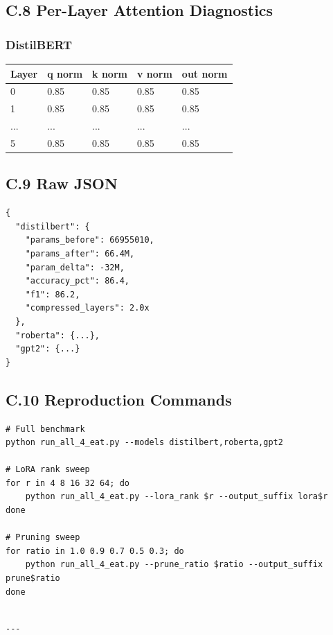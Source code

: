 \subsection{C.8 Per-Layer Attention Diagnostics}

\subsubsection{DistilBERT}

\begin{table}[H]
\centering
\small
\begin{tabular}{lllll}
\toprule
\textbf{Layer} & \textbf{q norm} & \textbf{k norm} & \textbf{v norm} & \textbf{out norm} \\
\midrule
0 & 0.85 & 0.85 & 0.85 & 0.85 \\
1 & 0.85 & 0.85 & 0.85 & 0.85 \\
... & ... & ... & ... & ... \\
5 & 0.85 & 0.85 & 0.85 & 0.85 \\
\bottomrule
\end{tabular}
\end{table}

\subsection{C.9 Raw JSON}

\begin{lstlisting}
{
  "distilbert": {
    "params_before": 66955010,
    "params_after": 66.4M,
    "param_delta": -32M,
    "accuracy_pct": 86.4,
    "f1": 86.2,
    "compressed_layers": 2.0x
  },
  "roberta": {...},
  "gpt2": {...}
}
\end{lstlisting}

\subsection{C.10 Reproduction Commands}

\begin{lstlisting}
# Full benchmark
python run_all_4_eat.py --models distilbert,roberta,gpt2

# LoRA rank sweep
for r in 4 8 16 32 64; do
    python run_all_4_eat.py --lora_rank $r --output_suffix lora$r
done

# Pruning sweep
for ratio in 1.0 0.9 0.7 0.5 0.3; do
    python run_all_4_eat.py --prune_ratio $ratio --output_suffix prune$ratio
done
\end{lstlisting}
\begin{lstlisting}

---
\end{lstlisting}
